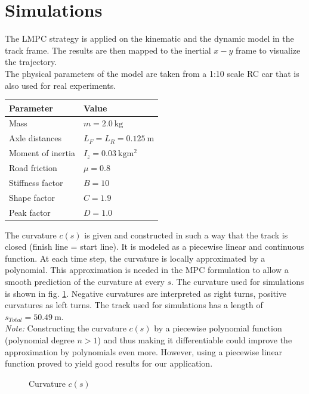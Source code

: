 \section{Simulations}
The LMPC strategy is applied on the kinematic and the dynamic model in the track frame. The results are then mapped to the inertial $x-y$ frame to visualize the trajectory.\\
The physical parameters of the model are taken from a 1:10 scale RC car that is also used for real experiments.

\begin{center}
\begin{tabular}{l|l}
Parameter & Value\\
\hline
Mass& $m=\SI{2.0}{\kilo\gram}$\\
Axle distances&$L_F=L_R = \SI{0.125}{\meter}$\\
Moment of inertia&$I_z = \SI{0.03}{\kilo\gram\square\meter}$\\
Road friction&$\mu = 0.8$\\
Stiffness factor & $B=10$\\ 
Shape factor & $C=1.9$\\
Peak factor & $D=1.0$
\end{tabular}
\end{center}
The curvature $c(s)$ is given and constructed in such a way that the track is closed (finish line = start line). It is modeled as a piecewise linear and continuous function. At each time step, the curvature is locally approximated by a polynomial. This approximation is needed in the MPC formulation to allow a smooth prediction of the curvature at every $s$. The curvature used for simulations is shown in fig. \ref{fig:Sim_curv}. Negative curvatures are interpreted as right turns, positive curvatures as left turns. The track used for simulations has a length of $s_{Total} = \SI{50.49}{\meter}$.\\
\emph{Note:} Constructing the curvature $c(s)$ by a piecewise polynomial function (polynomial degree $n>1$) and thus making it differentiable could improve the approximation by polynomials even more. However, using a piecewise linear function proved to yield good results for our application.
\begin{figure}[ht]
	\centering
  	
  	\caption{Curvature $c(s)$}
	\label{fig:Sim_curv}
\end{figure}

